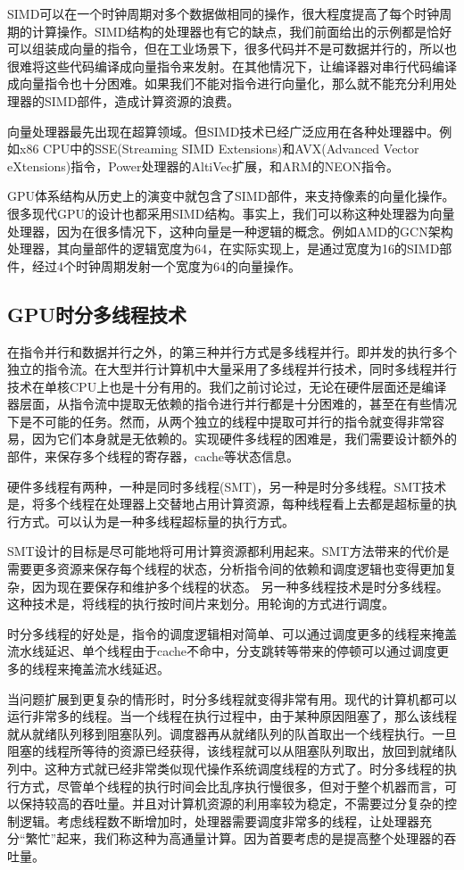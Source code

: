 SIMD可以在一个时钟周期对多个数据做相同的操作，很大程度提高了每个时钟周期的计算操作。SIMD结构的处理器也有它的缺点，我们前面给出的示例都是恰好可以组装成向量的指令，但在工业场景下，很多代码并不是可数据并行的，所以也很难将这些代码编译成向量指令来发射。在其他情况下，让编译器对串行代码编译成向量指令也十分困难。如果我们不能对指令进行向量化，那么就不能充分利用处理器的SIMD部件，造成计算资源的浪费。

向量处理器最先出现在超算领域。但SIMD技术已经广泛应用在各种处理器中。例如x86 CPU中的SSE(Streaming SIMD Extensions)和AVX(Advanced Vector eXtensions)指令，Power处理器的AltiVec扩展，和ARM的NEON指令。

GPU体系结构从历史上的演变中就包含了SIMD部件，来支持像素的向量化操作。很多现代GPU的设计也都采用SIMD结构。事实上，我们可以称这种处理器为向量处理器，因为在很多情况下，这种向量是一种逻辑的概念。例如AMD的GCN架构处理器，其向量部件的逻辑宽度为64，在实际实现上，是通过宽度为16的SIMD部件，经过4个时钟周期发射一个宽度为64的向量操作。

\subsection{GPU时分多线程技术}
在指令并行和数据并行之外，的第三种并行方式是多线程并行。即并发的执行多个独立的指令流。在大型并行计算机中大量采用了多线程并行技术，同时多线程并行技术在单核CPU上也是十分有用的。我们之前讨论过，无论在硬件层面还是编译器层面，从指令流中提取无依赖的指令进行并行都是十分困难的，甚至在有些情况下是不可能的任务。然而，从两个独立的线程中提取可并行的指令就变得非常容易，因为它们本身就是无依赖的。实现硬件多线程的困难是，我们需要设计额外的部件，来保存多个线程的寄存器，cache等状态信息。

硬件多线程有两种，一种是同时多线程(SMT)，另一种是时分多线程。SMT技术是，将多个线程在处理器上交替地占用计算资源，每种线程看上去都是超标量的执行方式。可以认为是一种多线程超标量的执行方式。

SMT设计的目标是尽可能地将可用计算资源都利用起来。SMT方法带来的代价是需要更多资源来保存每个线程的状态，分析指令间的依赖和调度逻辑也变得更加复杂，因为现在要保存和维护多个线程的状态。
另一种多线程技术是时分多线程。这种技术是，将线程的执行按时间片来划分。用轮询的方式进行调度。

时分多线程的好处是，指令的调度逻辑相对简单、可以通过调度更多的线程来掩盖流水线延迟、单个线程由于cache不命中，分支跳转等带来的停顿可以通过调度更多的线程来掩盖流水线延迟。

当问题扩展到更复杂的情形时，时分多线程就变得非常有用。现代的计算机都可以运行非常多的线程。当一个线程在执行过程中，由于某种原因阻塞了，那么该线程就从就绪队列移到阻塞队列。调度器再从就绪队列的队首取出一个线程执行。一旦阻塞的线程所等待的资源已经获得，该线程就可以从阻塞队列取出，放回到就绪队列中。这种方式就已经非常类似现代操作系统调度线程的方式了。时分多线程的执行方式，尽管单个线程的执行时间会比乱序执行慢很多，但对于整个机器而言，可以保持较高的吞吐量。并且对计算机资源的利用率较为稳定，不需要过分复杂的控制逻辑。考虑线程数不断增加时，处理器需要调度非常多的线程，让处理器充分“繁忙”起来，我们称这种为高通量计算。因为首要考虑的是提高整个处理器的吞吐量。


